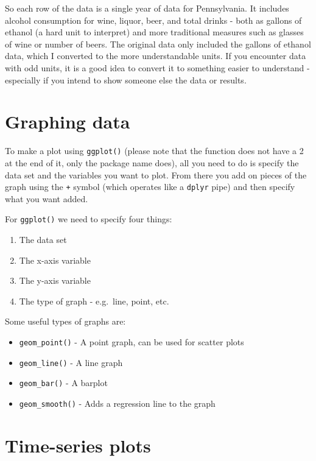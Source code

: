 \documentclass[
  a4paper,
]{krantz}
\providecommand{\tightlist}{%
  \setlength{\itemsep}{0pt}\setlength{\parskip}{0pt}}
\begin{document}
So each row of the data is a single year of data for
Pennsylvania. It includes alcohol consumption for wine,
liquor, beer, and total drinks - both as gallons of ethanol
(a hard unit to interpret) and more traditional measures
such as glasses of wine or number of beers. The original
data only included the gallons of ethanol data, which I
converted to the more understandable units. If you encounter
data with odd units, it is a good idea to convert it to
something easier to understand - especially if you intend to
show someone else the data or results.

\hypertarget{graphing-data}{%
\section{Graphing data}\label{graphing-data}}

To make a plot using \texttt{ggplot()} (please note that the
function does not have a 2 at the end of it, only the
package name does), all you need to do is specify the data
set and the variables you want to plot. From there you add
on pieces of the graph using the \texttt{+} symbol (which
operates like a \texttt{dplyr} pipe) and then specify what
you want added.

For \texttt{ggplot()} we need to specify four things:

\begin{enumerate}
\def\labelenumi{\arabic{enumi}.}
\tightlist
\item
  The data set
\item
  The x-axis variable
\item
  The y-axis variable
\item
  The type of graph - e.g.~line, point, etc.
\end{enumerate}

Some useful types of graphs are:

\begin{itemize}
\tightlist
\item
  \texttt{geom\_point()} - A point graph, can be used for
  scatter plots
\item
  \texttt{geom\_line()} - A line graph
\item
  \texttt{geom\_bar()} - A barplot
\item
  \texttt{geom\_smooth()} - Adds a regression line to the
  graph
\end{itemize}

\hypertarget{time-series-plots}{%
\section{Time-series plots}\label{time-series-plots}}
\end{document}
